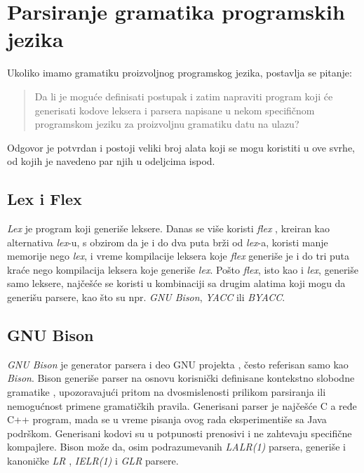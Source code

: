 \section{Parsiranje gramatika programskih jezika}
\label{sec:ParsingGrammars}

Ukoliko imamo gramatiku proizvoljnog programskog jezika, postavlja se pitanje: 
\begin{quote}
    Da li je moguće definisati postupak i zatim napraviti program koji će generisati kodove leksera i parsera napisane u nekom specifičnom programskom jeziku za proizvoljnu gramatiku datu na ulazu?
\end{quote}
Odgovor je potvrdan i postoji veliki broj alata koji se mogu koristiti u ove svrhe, od kojih je navedeno par njih u odeljcima ispod.

\subsection{Lex i Flex}
\label{subsec:LexFlex}
\emph{Lex} \cite{LexYacc} je program koji generiše leksere. Danas se više koristi \emph{flex} \cite{Flex}, kreiran kao alternativa \emph{lex}-u, s obzirom da je i do dva puta brži od \emph{lex}-a, koristi manje memorije nego \emph{lex}, i vreme kompilacije leksera koje \emph{flex} generiše je i do tri puta kraće nego kompilacija leksera koje generiše \emph{lex}. Pošto \emph{flex}, isto kao i \emph{lex}, generiše samo leksere, najčešće se koristi u kombinaciji sa drugim alatima koji mogu da generišu parsere, kao što su npr. \emph{GNU Bison}, \emph{YACC} ili \emph{BYACC}.

\subsection{GNU Bison}
\label{subsec:GNUBison}
\emph{GNU Bison} \cite{GNUBison} je generator parsera i deo GNU projekta \cite{GNUProject}, često referisan samo kao \emph{Bison}. Bison generiše parser na osnovu korisnički definisane kontekstno slobodne gramatike \cite{ContextFreeGrammars}, upozoravajući pritom na dvosmislenosti prilikom parsiranja ili nemogućnost primene gramatičkih pravila. Generisani parser je najčešće C a ređe C++ program, mada se u vreme pisanja ovog rada eksperimentiše sa Java podrškom. Generisani kodovi su u potpunosti prenosivi i ne zahtevaju specifične kompajlere. Bison može da, osim podrazumevanih \emph{LALR(1)} \cite{LALR1} parsera, generiše i kanoničke \emph{LR} \cite{LR}, \emph{IELR(1)} \cite{IELR1} i \emph{GLR} \cite{GLR} parsere.

